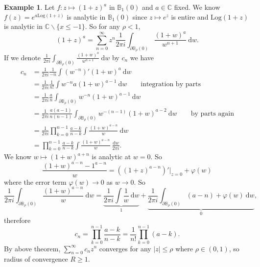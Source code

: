 \documentclass[a4paper]{article}
\newcommand{\Log}{\text{Log}}
\theoremstyle{definition}
\newtheorem{example}[defn]{Example}
\begin{document}
\begin{example}
Let $f:z\mapsto (1+z)^a$ in $\mathbb B_1(0)$ and $a\in \mathbb C$ fixed. We know $f(z) = e^{a \Log (1+z)}$ is analytic in $\mathbb B_1(0)$ since $z\mapsto e^z$ is entire and $\Log(1+z)$ is analytic in $\mathbb C \backslash \{x\leq -1\}$. So for any $\rho <1$,
\[
(1+z)^a = \sum_{n=0}^\infty z^n \frac{1}{2\pi i} \int_{\partial \mathbb B_\rho (0)} \frac{(1+w)^a}{w^{n+1}} \ \mathrm d w.
\]
If we denote $\frac{1}{2\pi i} \int_{\partial \mathbb B_\rho (0)} \frac{(1+w)^a}{w^{n+1}} \ \mathrm d w$ by $c_n$ we have
\[
\begin{aligned}
c_n&=\frac{1}{2\pi i} \frac{1}{-n} \int \left(w^{-n}\right)' (1+w)^a \ \mathrm d w \\
&=\frac{1}{2\pi i} \frac{1}{n!} \int w^{-n}a (1+w)^{a-1} \ \mathrm d w \qquad \text{integration by parts} \\
&= \frac{1}{2\pi i} \frac{a}{n} \int_{\partial \mathbb B_\rho (0)} w^{-n} (1+w)^{a-1} \ \mathrm d w \\
&=\frac{1}{2\pi i} \frac{a(a-1)}{n(n-1)} \int_{\partial \mathbb B_\rho (0)} w^{-(n-1)} (1+w) ^{a-2} \ \mathrm d w \qquad \text{by parts again} \\ 
&=\frac{1}{2\pi i } \prod_{k=0}^{n-1} \frac{a-k}{n-k} \int \frac{(1+w)^{a-n}}{w} \ \mathrm d w \\
&= \prod_{k=0}^{n-1} \frac{a-k}{n-k}\int \frac{(1+w)^{a-n}}{w} \ \frac{\mathrm d w}{2\pi i}.
\end{aligned}
\]
We know $w\mapsto (1+w)^{a+n}$ is analytic at $w=0$. So
\[
\frac{(1+w)^{a-n}-1^{a-n}}{w} = \left((1+z)^{a-n}\right)'|_{z=0} + \varphi(w)
\]
where the error term $\varphi(w)\rightarrow 0$ as $w\rightarrow 0$. So
\[
\frac{1}{2\pi i} \int_{\partial \mathbb B_\rho (0)} \frac{(1+w)^{a-n}}{w} \ \mathrm d w = \underbrace{\frac{1}{2\pi i} \int \frac{1}{w} \ \mathrm d w}_{1} + \underbrace{\frac{1}{2\pi i} \int_{\partial \mathbb B_\rho (0)} (a-n) +\varphi(w) \ \mathrm d w}_{0},
\]
therefore
\[
c_n = \prod_{k=0}^{n-1} \frac{a-k}{n-k}=\frac{1}{n!} \prod_{k=0}^{n-1} (a-k).
\]
By above theorem, $\sum_{n=0}^\infty c_n z^n$ converges for any $|z|\leq \rho$ where $\rho \in (0,1)$, so radius of convergence $R\geq 1$.
\end{example}
\end{document}
